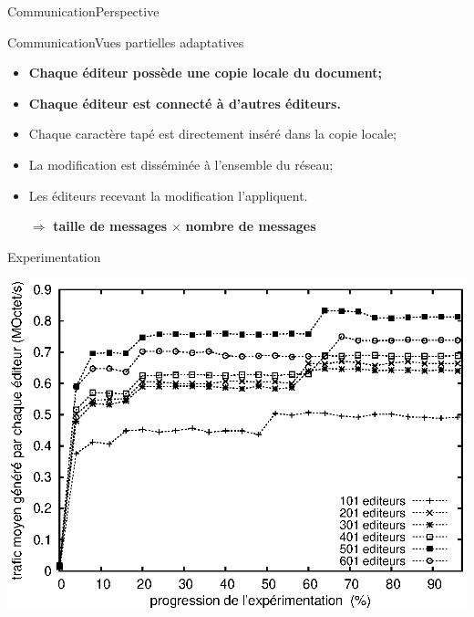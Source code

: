 \begin{frame}{Communication}{Perspective}
\begin{minipage}{0.325\textwidth}
  \end{minipage}

\end{frame}


\begin{frame}{Communication}{Vues partielles adaptatives}

  \hspace{-1cm}
  \begin{minipage}{0.55\textwidth}
    \begin{itemize}
      \item \textbf{Chaque éditeur possède une copie locale du document;}
      \item \textbf{Chaque éditeur est connecté à d'autres éditeurs.}
      \vspace{0.5cm}
    \item Chaque caractère tapé est directement inséré dans la copie locale;
    \item La modification est disséminée à l'ensemble du réseau;
    \item Les éditeurs recevant la modification l'appliquent.
    \end{itemize}
  \end{minipage}
  \hfill
  \begin{minipage}{0.44\textwidth}
    \begin{center}
      
    \end{center}
  \end{minipage}
  

  \vspace{1cm}
  \large
  \begin{itemize}
  \item [$\Rightarrow$] \textbf{taille de messages} $\times$ \textbf{nombre de messages}
  \end{itemize}

\end{frame}


\begin{frame}{\CRATE}{Experimentation}

  \begin{center}
    \includegraphics[width=1\textwidth]{img/editor/communication.eps}
  \end{center}

\end{frame}